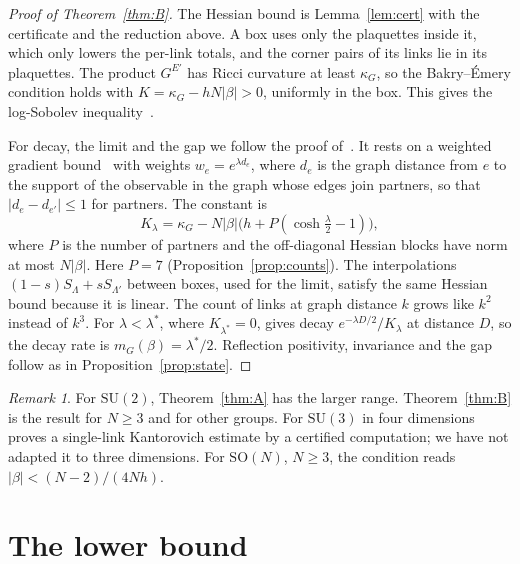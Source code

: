 \documentclass[11pt]{amsart}
\theoremstyle{definition}
\theoremstyle{remark}
\newtheorem{remark}[theorem]{Remark}
\newcommand{\SU}{\mathrm{SU}}
\newcommand{\SO}{\mathrm{SO}}
\begin{document}
\begin{proof}[Proof of Theorem~\ref{thm:B}]
The Hessian bound is Lemma~\ref{lem:cert} with the certificate and the reduction above. A box uses only the
plaquettes inside it, which only lowers the per-link totals, and the corner pairs of its links lie in its
plaquettes. The product $G^{E'}$ has Ricci curvature at least $\kappa_G$, so the Bakry--\'Emery condition holds with
$K=\kappa_G-hN|\beta|>0$, uniformly in the box. This gives the log-Sobolev inequality~\cite{BE}.

For decay, the limit and the gap we follow the proof of~\cite[Thm.~5]{BBL}. It rests on a weighted gradient
bound~\cite[Lem.~24]{BBL} with weights $w_e=e^{\lambda d_e}$, where $d_e$ is the graph distance from $e$ to the support
of the observable in the graph whose edges join partners, so that $|d_e-d_{e'}|\le1$ for partners. The constant is
\[
K_\lambda=\kappa_G-N|\beta|\big(h+P(\cosh\tfrac\lambda2-1)\big),
\]
where $P$ is the number of partners and the off-diagonal Hessian blocks have norm at most $N|\beta|$. Here $P=7$
(Proposition~\ref{prop:counts}). The interpolations $(1-s)S_\Lambda+sS_{\Lambda'}$ between boxes, used for the limit,
satisfy the same Hessian bound because it is linear. The count of links at graph distance $k$ grows like $k^2$
instead of $k^3$. For $\lambda<\lambda^*$, where $K_{\lambda^*}=0$, \cite[Lem.~25]{BBL} gives decay
$e^{-\lambda D/2}/K_\lambda$ at distance $D$, so the decay rate is $m_G(\beta)=\lambda^*/2$. Reflection positivity, invariance and the
gap follow as in Proposition~\ref{prop:state}.
\end{proof}

\begin{remark}
For $\SU(2)$, Theorem~\ref{thm:A} has the larger range. Theorem~\ref{thm:B} is the result for $N\ge3$ and for other
groups. For $\SU(3)$ in four dimensions~\cite[Thm.~6]{BBL} proves a single-link Kantorovich estimate by a
certified computation; we have not adapted it to three dimensions. For $\SO(N)$, $N\ge3$, the condition reads
$|\beta|<(N-2)/(4Nh)$.
\end{remark}

\section{The lower bound}\label{sec:lower}
\end{document}
